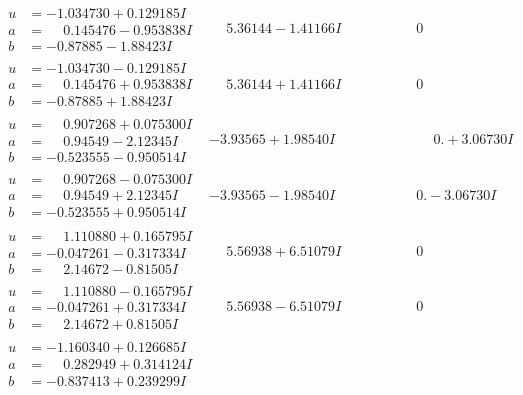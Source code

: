 \documentclass[1p]{elsarticle_modified}
\theoremstyle{definition}
\begin{document}
$$\begin{array}{c|c|c}
\begin{aligned}
u &= -1.034730 + 0.129185 I \\
a &= \phantom{-}0.145476 - 0.953838 I \\
b &= -0.87885 - 1.88423 I\end{aligned}
 & \phantom{-}5.36144 - 1.41166 I & \phantom{-0.000000 } 0 \\ \hline\begin{aligned}
u &= -1.034730 - 0.129185 I \\
a &= \phantom{-}0.145476 + 0.953838 I \\
b &= -0.87885 + 1.88423 I\end{aligned}
 & \phantom{-}5.36144 + 1.41166 I & \phantom{-0.000000 } 0 \\ \hline\begin{aligned}
u &= \phantom{-}0.907268 + 0.075300 I \\
a &= \phantom{-}0.94549 - 2.12345 I \\
b &= -0.523555 - 0.950514 I\end{aligned}
 & -3.93565 + 1.98540 I & \phantom{-0.000000 -}0. + 3.06730 I \\ \hline\begin{aligned}
u &= \phantom{-}0.907268 - 0.075300 I \\
a &= \phantom{-}0.94549 + 2.12345 I \\
b &= -0.523555 + 0.950514 I\end{aligned}
 & -3.93565 - 1.98540 I & \phantom{-0.000000 } 0. - 3.06730 I \\ \hline\begin{aligned}
u &= \phantom{-}1.110880 + 0.165795 I \\
a &= -0.047261 - 0.317334 I \\
b &= \phantom{-}2.14672 - 0.81505 I\end{aligned}
 & \phantom{-}5.56938 + 6.51079 I & \phantom{-0.000000 } 0 \\ \hline\begin{aligned}
u &= \phantom{-}1.110880 - 0.165795 I \\
a &= -0.047261 + 0.317334 I \\
b &= \phantom{-}2.14672 + 0.81505 I\end{aligned}
 & \phantom{-}5.56938 - 6.51079 I & \phantom{-0.000000 } 0 \\ \hline\begin{aligned}
u &= -1.160340 + 0.126685 I \\
a &= \phantom{-}0.282949 + 0.314124 I \\
b &= -0.837413 + 0.239299 I\end{aligned}

\end{array}$$
\end{document}
